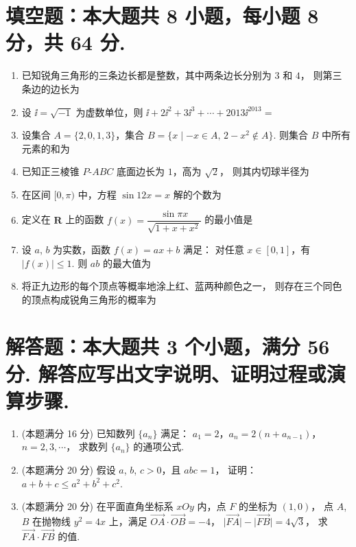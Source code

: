 \documentclass{chsmc}
\begin{document}
\section{填空题：本大题共 8 小题，每小题 8 分，共 64 分.}

\begin{enumerate}
	\item 已知锐角三角形的三条边长都是整数，其中两条边长分别为 $3$ 和 $4$，
		则第三条边的边长为 \blankline
	\item 设 $\ii = \sqrt{-1}$ 为虚数单位，则
		$\ii + 2\ii^2 + 3\ii^3 + \cdots + 2013\ii^{2013} =$ \blankline
	\item 设集合 $A = \{2,0,1,3\}$，集合
		$B = \{x\mid -x \in A,\, 2 - x^2 \notin A\}$.
		则集合 $B$ 中所有元素的和为 \blankline
	\item 已知正三棱锥 $P$-$ABC$ 底面边长为 $1$，高为 $\sqrt{2}$，
		则其内切球半径为 \blankline
	\item 在区间 $[0,\pi)$ 中，方程 $\sin 12x = x$ 解的个数为 \blankline
	\item 定义在 $\mathbf{R}$ 上的函数
		$f(x) = \dfrac{\sin \pi x}{\sqrt{1+x+x^2}}$ 的最小值是 \blankline
	\item 设 $a$, $b$ 为实数，函数 $f(x) = ax + b$ 满足：
		对任意 $x \in [0,1]$，有 $|f(x)| \leqslant 1$.
		则 $ab$ 的最大值为 \blankline
	\item 将正九边形的每个顶点等概率地涂上红、蓝两种颜色之一，
		则存在三个同色的顶点构成锐角三角形的概率为 \blankline
\end{enumerate}

\section{解答题：本大题共 3 个小题，满分 56 分. 解答应写出文字说明、证明过程或演算步骤.}

\begin{enumerate}[resume]
	\item (本题满分 16 分) 已知数列 $\{a_n\}$ 满足：
		$a_1 = 2$，$a_n = 2(n+a_{n-1})$，$n = 2,3,\cdots$，
		求数列 $\{a_n\}$ 的通项公式.
	\item (本题满分 20 分) 假设 $a$, $b$, $c > 0$，且 $abc = 1$，
		证明：$a+b+c \leqslant a^2+b^2+c^2$.
	\item (本题满分 20 分) 在平面直角坐标系 $xOy$ 内，点 $F$ 的坐标为 $(1,0)$，
		点 $A$, $B$ 在抛物线 $y^2 = 4x$ 上，满足
		$\overrightarrow{OA}\cdot\overrightarrow{OB} = -4$，
		$\bigl|\overrightarrow{FA}\bigr| - \bigl|\overrightarrow{FB}\bigr| = 4\sqrt{3}$，
		求 $\overrightarrow{FA}\cdot\overrightarrow{FB}$ 的值.
\end{enumerate}
\end{document}
